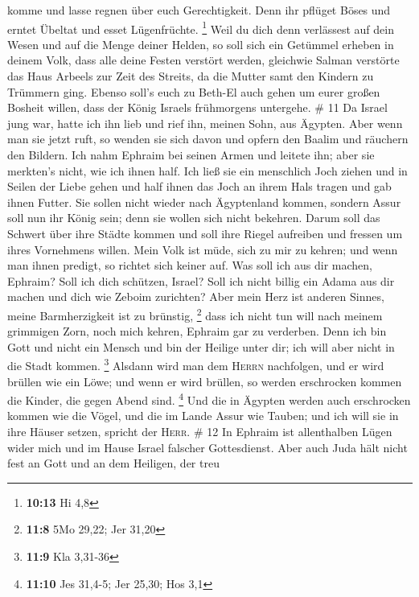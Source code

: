 komme und lasse regnen über euch Gerechtigkeit.  Denn ihr
pflüget Böses und erntet Übeltat und esset Lügenfrüchte. \footnote{\textbf{10:13}
  Hi 4,8}  Weil du dich denn verlässest auf dein Wesen
und auf die Menge deiner Helden, so soll sich ein Getümmel erheben in
deinem Volk, dass alle deine Festen verstört werden, gleichwie Salman
verstörte das Haus Arbeels zur Zeit des Streits, da die Mutter samt den
Kindern zu Trümmern ging.  Ebenso soll's euch zu Beth-El
auch gehen um eurer großen Bosheit willen, dass der König Israels
frühmorgens untergehe. \# 11  Da Israel jung war, hatte
ich ihn lieb und rief ihn, meinen Sohn, aus Ägypten.  Aber
wenn man sie jetzt ruft, so wenden sie sich davon und opfern den Baalim
und räuchern den Bildern.  Ich nahm Ephraim bei seinen
Armen und leitete ihn; aber sie merkten's nicht, wie ich ihnen half.
 Ich ließ sie ein menschlich Joch ziehen und in Seilen der
Liebe gehen und half ihnen das Joch an ihrem Hals tragen und gab ihnen
Futter.  Sie sollen nicht wieder nach Ägyptenland kommen,
sondern Assur soll nun ihr König sein; denn sie wollen sich nicht
bekehren.  Darum soll das Schwert über ihre Städte kommen
und soll ihre Riegel aufreiben und fressen um ihres Vornehmens willen.
 Mein Volk ist müde, sich zu mir zu kehren; und wenn man
ihnen predigt, so richtet sich keiner auf.  Was soll ich
aus dir machen, Ephraim? Soll ich dich schützen, Israel? Soll ich nicht
billig ein Adama aus dir machen und dich wie Zeboim zurichten? Aber mein
Herz ist anderen Sinnes, meine Barmherzigkeit ist zu brünstig,
\footnote{\textbf{11:8} 5Mo 29,22; Jer 31,20}  dass ich
nicht tun will nach meinem grimmigen Zorn, noch mich kehren, Ephraim gar
zu verderben. Denn ich bin Gott und nicht ein Mensch und bin der Heilige
unter dir; ich will aber nicht in die Stadt kommen. \footnote{\textbf{11:9}
  Kla 3,31-36}  Alsdann wird man dem \textsc{Herrn}
nachfolgen, und er wird brüllen wie ein Löwe; und wenn er wird brüllen,
so werden erschrocken kommen die Kinder, die gegen Abend sind.
\footnote{\textbf{11:10} Jes 31,4-5; Jer 25,30; Hos 3,1} 
Und die in Ägypten werden auch erschrocken kommen wie die Vögel, und die
im Lande Assur wie Tauben; und ich will sie in ihre Häuser setzen,
spricht der \textsc{Herr}. \# 12  In Ephraim ist
allenthalben Lügen wider mich und im Hause Israel falscher Gottesdienst.
Aber auch Juda hält nicht fest an Gott und an dem Heiligen, der treu
